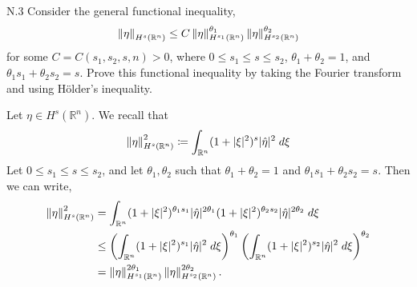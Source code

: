 \documentclass{article}
\begin{document}
\begin{prb}{N.3}
	Consider the general functional inequality, 
	\begin{equation*}
		\left\Vert \eta \right\Vert_{H^{s}(\mathbb{R}^{n})} \leq C \left\Vert \eta \right\Vert_{H^{s_{1}}(\mathbb{R}^{n})}^{\theta_{1}}\left\Vert \eta \right\Vert_{H^{s_{2}}(\mathbb{R}^{n})}^{\theta_{2}}
	\end{equation*} 
	for some $C = C(s_{1}, s_{2}, s, n) > 0$, where $0 \leq s_{1} \leq s \leq s_{2}$, $\theta_{1} + \theta_{2} = 1$, and $\theta_{1}s_{1} + \theta_{2}s_{2} = s$. Prove this functional inequality by taking the Fourier transform and using H\"older's inequality. 
\end{prb} 
Let $\eta \in H^{s}(\mathbb{R}^{n})$. We recall that 
\begin{equation*}
	\left\Vert \eta \right\Vert_{H^{s}(\mathbb{R}^{n})}^{2} \coloneqq \int_{\mathbb{R}^{n}}(1 + |\xi|^{2})^{s}|\hat{\eta}|^{2}\;d\xi
\end{equation*}
Let $0 \leq s_{1} \leq s \leq s_{2}$, and let $\theta_{1}, \theta_{2}$ such that $\theta_{1} + \theta_{2} = 1$ and $\theta_{1}s_{1} + \theta_{2}s_{2} = s$. Then we can write, 
\begin{align*}
	\begin{split} 
	\left\Vert \eta \right\Vert_{H^{s}(\mathbb{R}^{n})}^{2} &= \int_{\mathbb{R}^{n}}(1 + |\xi|^{2})^{\theta_{1}s_{1}}|\hat{\eta}|^{2\theta_{1}}(1 + |\xi|^{2})^{\theta_{2}s_{2}}|\hat{\eta}|^{2\theta_{2}}\;d\xi \\
	&\leq \left(\int_{\mathbb{R}^{n}}(1 + |\xi|^{2})^{s_{1}}|\hat{\eta}|^{2}\;d\xi\right)^{\theta_{1}}\left(\int_{\mathbb{R}^{n}}(1 + |\xi|^{2})^{s_{2}}|\hat{\eta}|^{2}\;d\xi \right)^{\theta_{2}} \\
	&= \left\Vert \eta \right\Vert_{H^{s_{1}}(\mathbb{R}^{n})}^{2\theta_{1}}\left\Vert \eta \right\Vert_{H^{s_{2}}(\mathbb{R}^{n})}^{2\theta_{2}}. 
	\end{split} 
\end{align*} 
\end{document}

